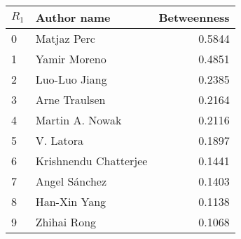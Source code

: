 \begin{tabular}{llr}
\toprule
\(R_1\) &            Author name &  Betweenness \\
\midrule
0 &            Matjaz Perc &                0.5844 \\
1 &           Yamir Moreno &                0.4851 \\
2 &          Luo-Luo Jiang &                0.2385 \\
3 &          Arne Traulsen &                0.2164 \\
4 &        Martin A. Nowak &                0.2116 \\
5 &              V. Latora &                0.1897 \\
6 &  Krishnendu Chatterjee &                0.1441 \\
7 &          Angel Sánchez &                0.1403 \\
8 &           Han-Xin Yang &                0.1138 \\
9 &            Zhihai Rong &                0.1068 \\
\bottomrule
\end{tabular}
